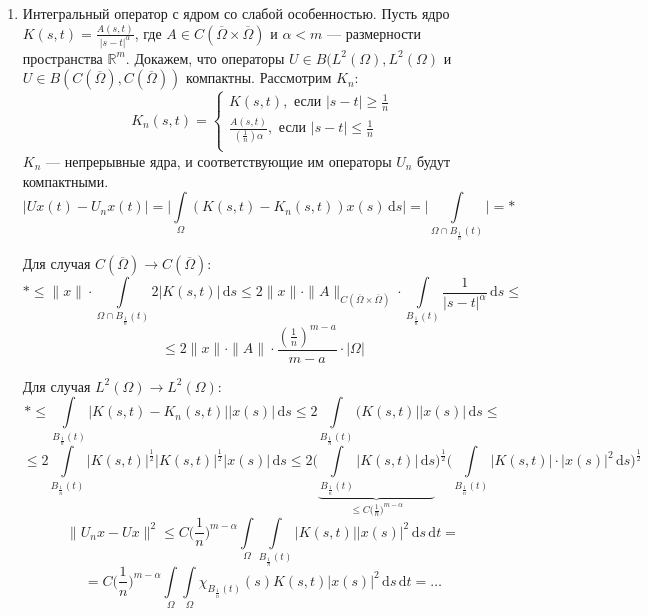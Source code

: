 \documentclass[11pt,openany,a4paper]{scrartcl}
\theoremstyle{plain}
\theoremstyle{definition}
\newcommand\mb{\mathbb}
\newcommand\real{\mb R}
\newcommand{\dif}{\, \mathrm d}
\newcommand\ol{\overline}
\begin{document}
\begin{enumerate}
    \item Интегральный оператор с ядром со слабой особенностью.
    Пусть ядро $K(s, t) = \frac{A(s, t)}{|s - t|^\alpha}$, где
    $A \in C(\ol \Omega \times \ol \Omega)$ и $\alpha < m$ — размерности пространства $\real^m$.
    Докажем, что операторы $U\in B(L^2(\Omega), L^2(\Omega)$ и
    $U \in B(C(\ol \Omega), C(\ol \Omega))$ компактны. Рассмотрим $K_n$:
    $$
    K_n(s,t) =
    \begin{cases}
        K(s, t),\text{ если } |s - t| \geqslant \frac{1}{n}\\
        \frac{A(s, t)}{(\frac{1}{n})\alpha},\text{ если } |s-t| \leqslant \frac{1}{n}\\
    \end{cases}
    $$
    $K_n$ — непрерывные ядра, и соответствующие им операторы $U_n$ будут компактными.
    $$
    |Ux(t) - U_nx(t)| = \bigg|\int\limits_\Omega (K(s, t) - K_n(s, t))x(s) \dif s\bigg| =
    \bigg|\int\limits_{\Omega \cap B_{\frac{1}{n}}(t)}\bigg| = \ast
    $$
    
    Для случая $C(\ol \Omega) \to C(\ol \Omega)$:
    $$
    \ast \leqslant \|x\|\cdot \int\limits_{\Omega \cap B_{\frac{1}{n}}(t)} 2|K(s, t)|\dif s
    \leqslant 2\|x\| \cdot \|A\|_{C(\ol \Omega \times \ol \Omega)} \cdot
    \int\limits_{B_{\frac{1}{n}}(t)} \frac{1}{|s-t|^\alpha}\dif s \leqslant
    $$
    $$
    \leqslant
    2\|x\|\cdot \|A\| \cdot \frac{(\frac{1}{n})^{m-a}}{m-a}\cdot |\Omega|
    $$
    
    Для случая $L^2(\Omega) \to L^2(\Omega)$:
    $$
    \ast \leqslant \int\limits_{B_{\frac{1}{n}}(t)}|K(s, t) - K_n(s, t)||x(s)|\dif s \leqslant
    2\int\limits_{B_{\frac{1}{n}}(t)} (K(s, t)||x(s)| \dif s \leqslant
    $$
    $$
    \leqslant
    2\int\limits_{B_{\frac{1}{n}}(t)}|K(s,t)|^\frac{1}{2}|K(s,t)|^\frac{1}{2} |x(s)| \dif s 
    \leqslant
    2\bigg(\underbrace{\int\limits_{B_{\frac{1}{n}}(t)} |K(s, t)|\dif s}_{\leqslant
    C\big(\frac{1}{n}\big)^{m-\alpha}}\bigg)^\frac{1}{2}
    \bigg(\int\limits_{B_{\frac{1}{n}}(t)}|K(s, t)| \cdot |x(s)|^2 \dif s\bigg)^\frac{1}{2}
    $$
    $$
    \|U_nx - Ux\|^2 \leqslant C\Big(\frac{1}{n}\Big)^{m - \alpha}
    \int\limits_\Omega \int\limits_{B_{\frac{1}{n}}(t)}
    |K(s, t)||x(s)|^2 \dif s \dif t =
    $$
    $$
    =
    C\Big(\frac{1}{n}\Big)^{m - \alpha}
    \int\limits_\Omega\int\limits_\Omega \chi_{B_{\frac{1}{n}}(t)}(s)K(s, t) |x(s)|^2 \dif s \dif t
    = \ldots
    $$
\end{enumerate}

\end{document}
